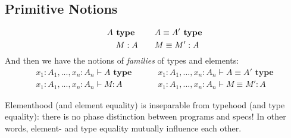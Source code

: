 \documentclass[letterpaper]{article}
\begin{document}
\subsection{Primitive Notions}
\begin{align*}
    A \textbf{ type } & \qquad  A \equiv A' \textbf{ type} \\
    M : A  & \qquad M \equiv M' : A \\[-0.4\baselineskip]
\end{align*}

\vspace{-\baselineskip}
And then we have the notions of \emph{families} of types and elements:
\begin{align*}
    x_1 : A_1, ..., x_n : A_n \vdash A \textbf{ type } & \qquad x_1 : A_1, ..., x_n : A_n \vdash A \equiv A' \textbf{ type} \\
    x_1 : A_1, ..., x_n : A_n \vdash M : A & \qquad x_1 : A_1, ..., x_n : A_n \vdash M \equiv M' : A
\end{align*}

Elementhood (and element equality) is inseparable from typehood (and type equality): there is no phase distinction between programs and specs! In other words, element- and type equality mutually influence each other.
\end{document}
